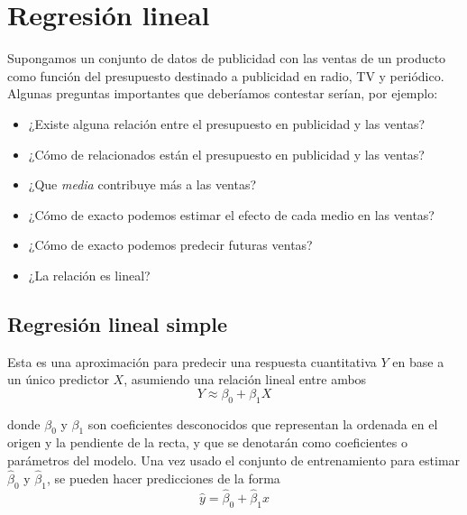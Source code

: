 \chapter{Regresión lineal}\label{Chapter2} 

\begin{example}
Supongamos un conjunto de datos de publicidad con las ventas de un producto como función del presupuesto destinado a publicidad en radio, TV y periódico. Algunas preguntas importantes que deberíamos contestar serían, por ejemplo: 
\begin{multicols}{2}
\begin{itemize}
\item ¿Existe alguna relación entre el presupuesto en publicidad y las ventas? 
\item ¿Cómo de relacionados están el presupuesto en publicidad y las ventas?
\item ¿Que \textit{media} contribuye más a las ventas?
\item ¿Cómo de exacto podemos estimar el efecto de cada medio en las ventas?
\item ¿Cómo de exacto podemos predecir futuras ventas?
\item ¿La relación es lineal?
\end{itemize}
\end{multicols}
\end{example}



\section{Regresión lineal simple}

Esta es una aproximación para predecir una respuesta cuantitativa $Y$ en base a un único predictor $X$, asumiendo una relación lineal entre ambos
\begin{equation}
Y \approx \beta_0 + \beta_1 X
\end{equation} 

\noindent donde $\beta_0$ y $\beta_1$ son coeficientes desconocidos que representan la ordenada en el origen y la pendiente de la recta, y que se denotarán como coeficientes o parámetros del modelo. Una vez usado el conjunto de entrenamiento para estimar $\hat{\beta}_0$ y $\hat{\beta}_1$, se pueden hacer predicciones de la forma 
\begin{equation}
\hat{y} = \hat{\beta}_0 + \hat{\beta}_1 x
\label{eq:3.2}
\end{equation} 

